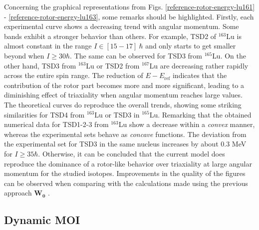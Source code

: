 Concerning the graphical representations from Figs. \ref{reference-rotor-energy-lu161} - \ref{reference-rotor-energy-lu163}, some remarks should be highlighted. Firstly, each experimental curve shows a decreasing trend with angular momentum. Some bands exhibit a stronger behavior than others. For example, TSD2 of $^{163}$Lu is almost constant in the range $I\in[15-17]\ \hbar$ and only starts to get smaller beyond when $I\geq 30\hbar$. The same can be observed for TSD3 from $^{165}$Lu. On the other hand, TSD3 from $^{163}$Lu or TSD2 from $^{167}$Lu are decreasing rather rapidly across the entire spin range. The reduction of $E-E_\text{ref}$ indicates that the contribution of the rotor part becomes more and more significant, leading to a diminishing effect of triaxiality when angular momentum reaches large values. The theoretical curves do reproduce the overall trends, showing some striking similarities for TSD4 from $^{163}$Lu or TSD3 in $^{165}$Lu. Remarking that the obtained numerical data for TSD1-2-3 from $^{163}$Lu show a decrease within a \emph{convex} manner, whereas the experimental sets behave as \emph{concave} functions. The deviation from the experimental set for TSD3 in the same nucleus increases by about 0.3 MeV for $I\geq 35\hbar$. Otherwise, it can be concluded that the current model does reproduce the dominance of a rotor-like behavior over triaxiality at large angular momentum for the studied isotopes. Improvements in the quality of the figures can be observed when comparing with the calculations made using the previous approach $\mathbf{W_0}$ \cite{raduta2018wobbling}.

\subsection{Dynamic MOI}

